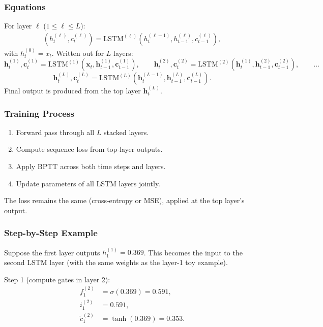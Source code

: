 \documentclass[11pt]{article}
\theoremstyle{remark}
\begin{document}
\subsubsection*{Equations}
For layer $\ell$ ($1 \leq \ell \leq L$):
\begin{align}
(h_t^{(\ell)}, c_t^{(\ell)}) = \mathrm{LSTM}^{(\ell)}(h_t^{(\ell-1)}, h_{t-1}^{(\ell)}, c_{t-1}^{(\ell)}),
\end{align}
with $h_t^{(0)} = x_t$. Written out for $L$ layers:
\[
\mathbf{h}_t^{(1)}, \mathbf{c}_t^{(1)} = \text{LSTM}^{(1)}(\mathbf{x}_t, \mathbf{h}_{t-1}^{(1)}, \mathbf{c}_{t-1}^{(1)}), \qquad
\mathbf{h}_t^{(2)}, \mathbf{c}_t^{(2)} = \text{LSTM}^{(2)}(\mathbf{h}_t^{(1)}, \mathbf{h}_{t-1}^{(2)}, \mathbf{c}_{t-1}^{(2)}), \qquad \dots
\]
\[
\mathbf{h}_t^{(L)}, \mathbf{c}_t^{(L)} = \text{LSTM}^{(L)}(\mathbf{h}_t^{(L-1)}, \mathbf{h}_{t-1}^{(L)}, \mathbf{c}_{t-1}^{(L)}).
\]
Final output is produced from the top layer $\mathbf{h}_t^{(L)}$.

\subsubsection*{Training Process}
\begin{enumerate}[label=\roman*)]
    \item Forward pass through all $L$ stacked layers.
    \item Compute sequence loss from top-layer outputs.
    \item Apply BPTT across both time steps and layers.
    \item Update parameters of all LSTM layers jointly.
\end{enumerate}
The loss remains the same (cross-entropy or MSE), applied at the top layer's output.

\subsubsection*{Step-by-Step Example}
Suppose the first layer outputs $h_1^{(1)} = 0.369$. This becomes the input to the second LSTM layer (with the same weights as the layer-1 toy example).

Step 1 (compute gates in layer 2):
\begin{align*}
    f_1^{(2)} &= \sigma(0.369) = 0.591, \\
    i_1^{(2)} &= 0.591, \\
    \tilde{c}_1^{(2)} &= \tanh(0.369) = 0.353.
\end{align*}
\end{document}
